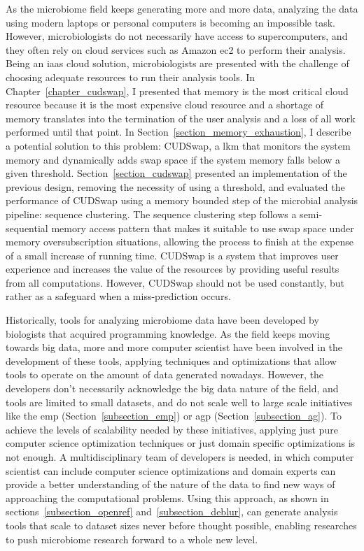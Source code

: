 As the microbiome field keeps generating more and more data, analyzing the data
using modern laptops or personal computers is becoming an impossible task. However,
microbiologists do not necessarily have access to supercomputers, and they often
rely on cloud services such as Amazon \gls{ec2} to perform their analysis. Being an \gls{iaas}
cloud solution, microbiologists are presented with the challenge of choosing adequate
resources to run their analysis tools. In Chapter~\ref{chapter_cudswap}, I presented
that memory is the most critical cloud resource because it is the most expensive
cloud resource and a shortage of memory translates into the termination of the user
analysis and a loss of all work performed until that point. In Section~\ref{section_memory_exhaustion},
I describe a potential solution to this problem: CUDSwap, a \gls{lkm} that monitors
the system memory and dynamically adds swap space if the system memory falls below
a given threshold. Section~\ref{section_cudswap} presented an implementation of
the previous design, removing the necessity of using a threshold, and
evaluated the performance of CUDSwap using a memory bounded step of the
microbial analysis pipeline: sequence clustering. The sequence clustering step
follows a semi-sequential memory access pattern that makes it suitable to use
swap space under memory oversubscription situations, allowing the process to
finish at the expense of a small increase of running time. CUDSwap is a system
that improves user experience and increases the value of the resources by providing
useful results from all computations. However, CUDSwap should not be used constantly,
but rather as a safeguard when a miss-prediction occurs.

Historically, tools for analyzing microbiome data have been developed by biologists
that acquired programming knowledge. As the field keeps moving towards big data,
more and more computer scientist have been involved in the development of these
tools, applying techniques and optimizations that allow tools to operate on the
amount of data generated nowadays. However, the developers don’t necessarily
acknowledge the big data nature of the field, and tools are limited to small
datasets, and do not scale well to large scale initiatives like the \gls{emp}
(Section~\ref{subsection_emp}) or \gls{agp} (Section~\ref{subsection_ag}). To
achieve the levels of scalability needed by these initiatives, applying just pure
computer science optimization techniques or just domain specific optimizations is
not enough. A multidisciplinary team of developers is needed, in which computer
scientist can include computer science optimizations and domain experts can provide
a better understanding of the nature of the data to find new ways of approaching
the computational problems. Using this approach, as shown in sections~\ref{subsection_openref}
and~\ref{subsection_deblur}, can generate analysis tools that scale to dataset
sizes never before thought possible, enabling researches to push microbiome
research forward to a whole new level.

